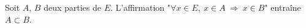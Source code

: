 Soit $A$, $B$ deux parties de $E$. L'affirmation "$\forall x\in E,\ x\in A\  \Rightarrow \  x\in B$" entraîne $A\subset B$.

\begin{reponses}
\end{reponses}

